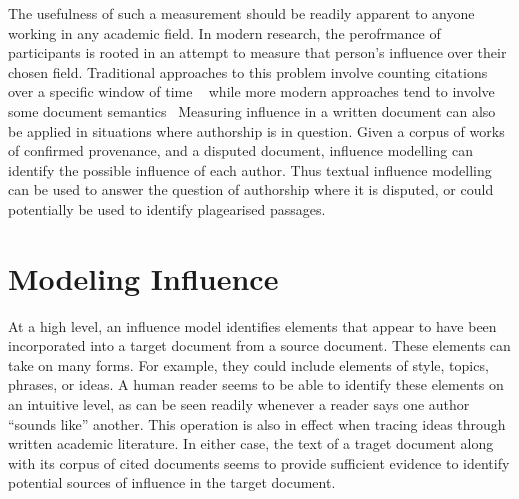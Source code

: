 \documentclass[../dissertation.tex]{subfiles}
\begin{document}
The usefulness of such a measurement should be readily apparent to
anyone working in any academic field.  In modern research, the
perofrmance of participants is rooted in an attempt to measure that
person's influence over their chosen field.  Traditional approaches to
this problem involve counting citations over a specific window of time
~\cite{adler2009} while more modern approaches tend to involve some
document semantics~\cite{dietz2007, jiang2014} Measuring
influence in a written document can also be applied in situations
where authorship is in question.  Given a corpus of works of confirmed
provenance, and a disputed document, influence modelling can identify
the possible influence of each author.  Thus textual influence
modelling can be used to answer the question of authorship where it is
disputed, or could potentially be used to identify plagearised
passages.


\section{Modeling Influence}
At a high level, an influence model identifies elements that appear to
have been incorporated into a target document from a source document.
These elements can take on many forms.  For example, they could
include elements of style, topics, phrases, or ideas.  A human reader
seems to be able to identify these elements on an intuitive level, as
can be seen readily whenever a reader says one author ``sounds like''
another.  This operation is also in effect when tracing ideas through
written academic literature.  In either case, the text of a traget
document along with its corpus of cited documents seems to provide
sufficient evidence to identify potential sources of influence in the
target document.
\end{document}
